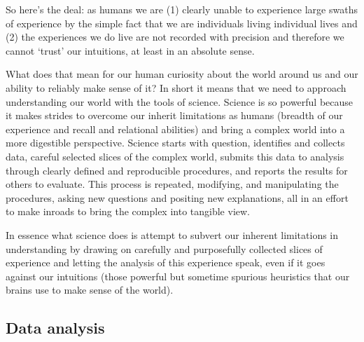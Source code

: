 \documentclass[
]{article}
\begin{document}
So here's the deal: as humans we are (1) clearly unable to experience large swaths of experience by the simple fact that we are individuals living individual lives and (2) the experiences we do live are not recorded with precision and therefore we cannot `trust' our intuitions, at least in an absolute sense.

What does that mean for our human curiosity about the world around us and our ability to reliably make sense of it? In short it means that we need to approach understanding our world with the tools of science. Science is so powerful because it makes strides to overcome our inherit limitations as humans (breadth of our experience and recall and relational abilities) and bring a complex world into a more digestible perspective. Science starts with question, identifies and collects data, careful selected slices of the complex world, submits this data to analysis through clearly defined and reproducible procedures, and reports the results for others to evaluate. This process is repeated, modifying, and manipulating the procedures, asking new questions and positing new explanations, all in an effort to make inroads to bring the complex into tangible view.

In essence what science does is attempt to subvert our inherent limitations in understanding by drawing on carefully and purposefully collected slices of experience and letting the analysis of this experience speak, even if it goes against our intuitions (those powerful but sometime spurious heuristics that our brains use to make sense of the world).

\hypertarget{data-analysis}{%
\subsection{Data analysis}\label{data-analysis}}
\end{document}
